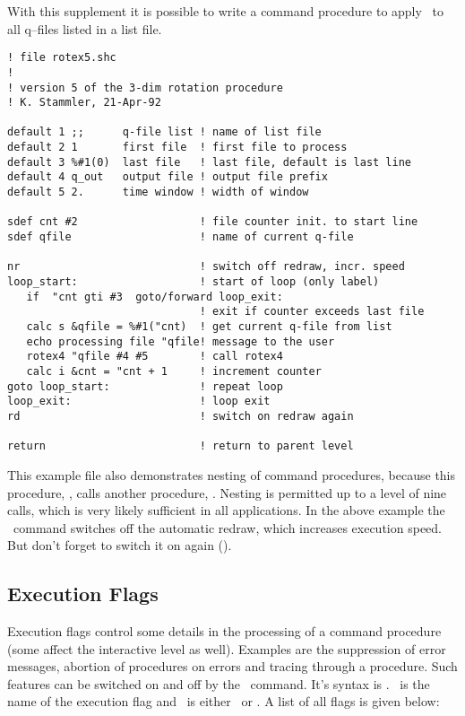 With this supplement it is possible to write a command procedure
to apply \ to all q--files listed in a list file.

\begin{verbatim}
! file rotex5.shc
!
! version 5 of the 3-dim rotation procedure
! K. Stammler, 21-Apr-92

default 1 ;;      q-file list ! name of list file
default 2 1       first file  ! first file to process
default 3 %#1(0)  last file   ! last file, default is last line
default 4 q_out   output file ! output file prefix
default 5 2.      time window ! width of window

sdef cnt #2                   ! file counter init. to start line
sdef qfile                    ! name of current q-file

nr                            ! switch off redraw, incr. speed
loop_start:                   ! start of loop (only label)
   if  "cnt gti #3  goto/forward loop_exit:
                              ! exit if counter exceeds last file
   calc s &qfile = %#1("cnt)  ! get current q-file from list
   echo processing file "qfile! message to the user
   rotex4 "qfile #4 #5        ! call rotex4
   calc i &cnt = "cnt + 1     ! increment counter
goto loop_start:              ! repeat loop
loop_exit:                    ! loop exit
rd                            ! switch on redraw again

return                        ! return to parent level
\end{verbatim}

This example file also demonstrates nesting of command procedures,
because this procedure, , calls another procedure,
.  Nesting is permitted up to a level of nine calls,
which is very likely sufficient in all applications.  In the
above example the \ command switches off the automatic
redraw, which increases execution speed.  But don't forget to
switch it on again ().



\subsection{Execution Flags}
\label{sec:ExecFlags}

Execution flags control some details in the processing of a
command procedure (some affect the interactive level as well).
Examples are the suppression of error
messages, abortion of procedures on errors and tracing through
a procedure.  Such features can be switched on and off by the
\ command.  It's syntax is .
\ is the name of the execution flag and \
is either \ or .  A list of all flags is given
below:


